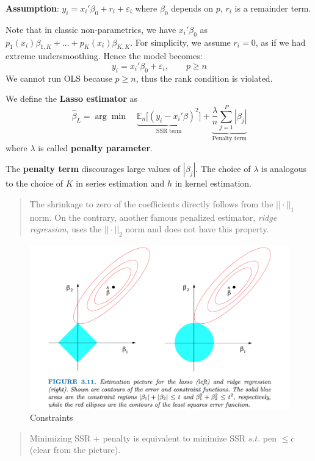 \documentclass[12pt,]{book}
\begin{document}
\textbf{Assumption}:
\(y_i = x_i' \beta_0 + r_i + \varepsilon_i\) where \(\beta_0\) depends on \(p\), \(r_i\) is a remainder term.

Note that in classic non-parametrics, we have \(x_i'\beta_0\) as \(p_1(x_i) \beta_{1,K} + \dots + p_K(x_i) \beta_{K,K}\). For simplicity, we assume \(r_i = 0\), as if we had extreme undersmoothing. Hence the model becomes:
\[
    y_i = x_i' \beta_0 + \varepsilon_i, \qquad p \geq n
\]
We cannot run OLS because \(p \geq n\), thus the rank condition is violated.

We define the \textbf{Lasso estimator} as
\[
    \hat{\beta}_L = \arg \min \quad \underbrace{\mathbb E_n \Big[ (y_i - x_i' \beta)^2 \Big]}_{\text{SSR term}} + \underbrace{\frac{\lambda}{n} \sum_{j=1}^{P} | \beta_j |}_{\text{Penalty term}}
\]
where \(\lambda\) is called \textbf{penalty parameter}.

The \textbf{penalty term} discourages large values of \(| \beta_j |\).
The choice of \(\lambda\) is analogous to the choice of \(K\) in series estimation and \(h\) in kernel estimation.

\begin{quote}
The shrinkage to zero of the coefficients directly follows from the \(|| \cdot ||_1\) norm. On the contrary, another famous penalized estimator, \emph{ridge regression}, uses the \(|| \cdot ||_2\) norm and does not have this property.
\end{quote}

\begin{figure}
\centering
\includegraphics{figures/Fig_551.png}
\caption{Constraints}
\end{figure}

\begin{quote}
Minimizing SSR + penalty is equivalent to minimize SSR \(s.t.\) pen \(\leq c\) (clear from the picture).
\end{quote}
\end{document}
